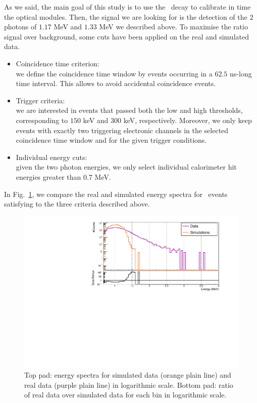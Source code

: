 As we said, the main goal of this study is to use the \Co\ decay to calibrate in time the optical modules.
Then, the signal we are looking for is the detection of the $2$ photons of $1.17$ MeV and $1.33$ MeV we described above.
To maximise the ratio signal over background, some cuts have been applied on the real and simulated data.
\begin{itemize}
\item Coincidence time criterion:\\ we define the coincidence time window by events occurring in a $62.5$ ns-long time interval.
  This allows to avoid accidental coincidence events.
\item Trigger criteria:\\ we are interested in events that passed both the low and high thresholds, corresponding to $150$ keV and $300$ keV, respectively.
  Moreover, we only keep events with exactly two triggering electronic channels in the selected coincidence time window and for the given trigger conditions.
\item Individual energy cuts:\\ given the two photon energies, we only select individual calorimeter hit energies greater than $0.7$ MeV.
\end{itemize}
In Fig.~\ref{fig:detector_efficiency}, we compare the real and simulated energy spectra for \Co\ events satisfying to the three criteria described above.
\begin{figure}[h]
  \centering
  \includegraphics[width=17cm]{commissioning/fig_commissioning/Co_efficiency_detector.pdf}
  \caption{Top pad: energy spectra for simulated data (orange plain line) and real data (purple plain line) in logarithmic scale.
    Bottom pad: ratio of real data over simulated data for each bin in logarithmic scale.
\label{fig:detector_efficiency}}
\end{figure}
